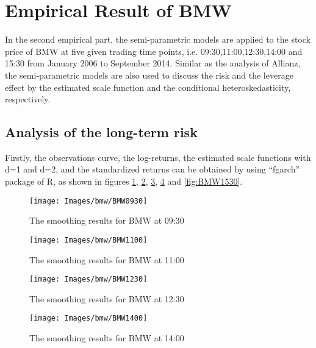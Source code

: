 \section{Empirical Result of BMW}



In the second empirical part, the semi-parametric models are applied to the stock price of BMW at five given trading time points, i.e. 09:30,11:00,12:30,14:00 and 15:30 from January 2006 to September 2014. Similar as the analysis of Allianz, the semi-parametric models are also used to discuss the risk and the leverage effect by the estimated scale function and the conditional heteroskedasticity, respectively.

\subsection{Analysis of the long-term risk}

Firstly, the observations curve, the log-returns, the estimated scale functions with d=1 and d=2, and the standardized returns can be obtained by using ``fgarch'' package of R, as shown in figures \ref{fig:BMW0930}, \ref{fig:BMW1100}, \ref{fig:BMW1230}, \ref{fig:BMW1400} and \ref{fig:BMW1530}.


\begin{figure}[!htbp]
	\centering
	\texttt{[image: Images/bmw/BMW0930]}
	\caption[The smoothing results for BMW at 09:30]{The smoothing results for BMW at 09:30}
	\label{fig:BMW0930}
\end{figure}

\begin{figure}[!htbp]
	\centering
	\texttt{[image: Images/bmw/BMW1100]}
	\caption[The smoothing results for BMW at 11:00]{The smoothing results for BMW at 11:00}
	\label{fig:BMW1100}
\end{figure}


\begin{figure}[!htbp]
	\centering
	\texttt{[image: Images/bmw/BMW1230]}
	\caption[The smoothing results for BMW at 12:30]{The smoothing results for BMW at 12:30}
	\label{fig:BMW1230}
\end{figure}


\begin{figure}[!htbp]
	\centering
	\texttt{[image: Images/bmw/BMW1400]}
	\caption[The smoothing results for BMW at 14:00]{The smoothing results for BMW at 14:00}
	\label{fig:BMW1400}
\end{figure}


